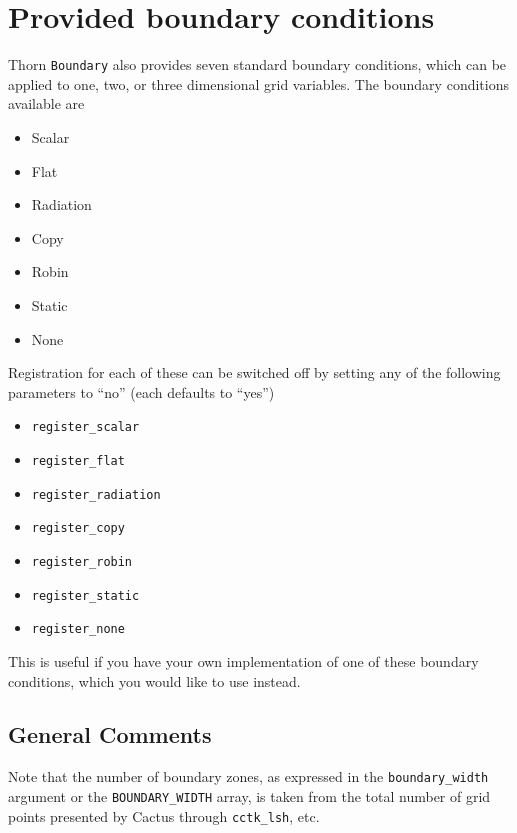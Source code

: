 \documentclass{article}
\begin{document}
\section{Provided boundary conditions}
\label{Boundary/sec:provided_bcs}
Thorn \texttt{Boundary} also provides seven standard boundary
conditions, which can be applied to one, two, or three dimensional
grid variables.  The boundary conditions available are
\begin{itemize}
\item Scalar
\item Flat 
\item Radiation 
\item Copy
\item Robin
\item Static
\item None
\end{itemize}

Registration for each of these can be switched off by setting any of
the following parameters to ``no'' (each defaults to ``yes'')
\begin{itemize}
\item \texttt{register\_scalar}
\item \texttt{register\_flat}
\item \texttt{register\_radiation}
\item \texttt{register\_copy}
\item \texttt{register\_robin}
\item \texttt{register\_static}
\item \texttt{register\_none}
\end{itemize}
This is useful if you have your own implementation of one of these
boundary conditions, which you would like to use instead.


\subsection{General Comments}

Note that the number of boundary zones, as expressed in the
\texttt{boundary\_width} argument or the \texttt{BOUNDARY\_WIDTH}
array, is taken from the total number of grid points presented by
Cactus through \texttt{cctk\_lsh}, etc.  
\end{document}
